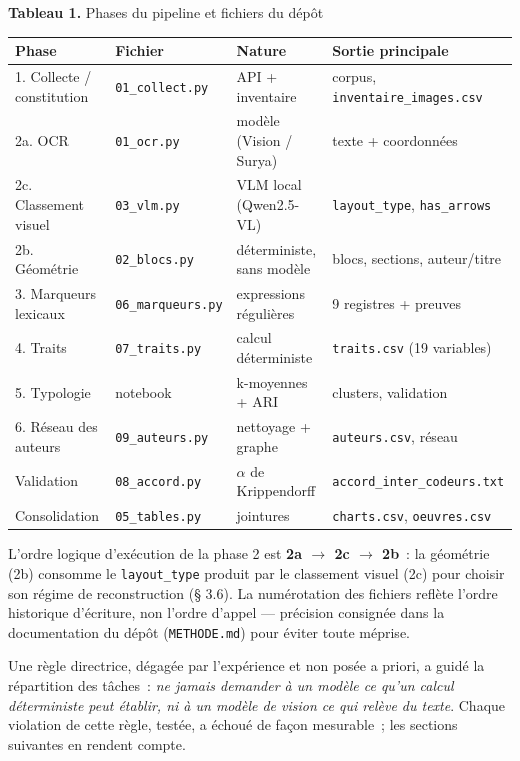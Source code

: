 \documentclass[11pt,a4paper]{article}
\begin{document}
\noindent \textbf{Tableau 1.} Phases du pipeline et fichiers du dépôt\\[-0.2em]

\begin{center}\small
\begin{tabular}{llll}
\toprule
\textbf{Phase} & \textbf{Fichier} & \textbf{Nature} & \textbf{Sortie principale} \\
\midrule
1. Collecte / constitution & \texttt{01\_collect.py} & API + inventaire & corpus, \texttt{inventaire\_images.csv} \\
2a. OCR & \texttt{01\_ocr.py} & modèle (Vision / Surya) & texte + coordonnées \\
2c. Classement visuel & \texttt{03\_vlm.py} & VLM local (Qwen2.5-VL) & \texttt{layout\_type}, \texttt{has\_arrows} \\
2b. Géométrie & \texttt{02\_blocs.py} & déterministe, sans modèle & blocs, sections, auteur/titre \\
3. Marqueurs lexicaux & \texttt{06\_marqueurs.py} & expressions régulières & 9 registres + preuves \\
4. Traits & \texttt{07\_traits.py} & calcul déterministe & \texttt{traits.csv} (19 variables) \\
5. Typologie & notebook & k-moyennes + ARI & clusters, validation \\
6. Réseau des auteurs & \texttt{09\_auteurs.py} & nettoyage + graphe & \texttt{auteurs.csv}, réseau \\
Validation & \texttt{08\_accord.py} & $\alpha$ de Krippendorff & \texttt{accord\_inter\_codeurs.txt} \\
Consolidation & \texttt{05\_tables.py} & jointures & \texttt{charts.csv}, \texttt{oeuvres.csv} \\
\bottomrule
\end{tabular}
\end{center}

L'ordre logique d'exécution de la phase 2 est \textbf{2a $\rightarrow$ 2c $\rightarrow$ 2b}~: la géométrie (2b) consomme le \texttt{layout\_type} produit par le classement visuel (2c) pour choisir son régime de reconstruction (§ 3.6). La numérotation des fichiers reflète l'ordre historique d'écriture, non l'ordre d'appel --- précision consignée dans la documentation du dépôt (\texttt{METHODE.md}) pour éviter toute méprise.

Une règle directrice, dégagée par l'expérience et non posée a priori, a guidé la répartition des tâches~: \emph{ne jamais demander à un modèle ce qu'un calcul déterministe peut établir, ni à un modèle de vision ce qui relève du texte}. Chaque violation de cette règle, testée, a échoué de façon mesurable~; les sections suivantes en rendent compte.
\end{document}
